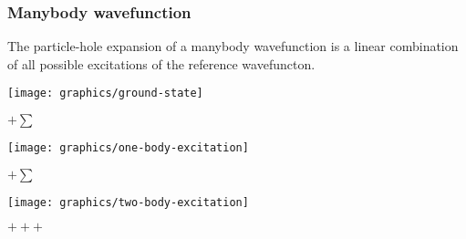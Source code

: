 \begin{frame}[fragile]
    \frametitle{Manybody wavefunction}
    
    The particle-hole expansion of a manybody wavefunction is a linear combination of all possible excitations of the reference wavefuncton.
\begin{center}
\parbox{0.23\textwidth}{\texttt{[image: graphics/ground-state]}} $+ \sum$
\parbox{0.23\textwidth}{\texttt{[image: graphics/one-body-excitation]}} $+ \sum$
\parbox{0.23\textwidth}{\texttt{[image: graphics/two-body-excitation]}} $+++$
\end{center}
\end{frame}

